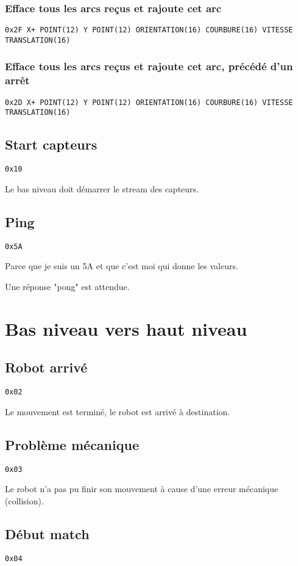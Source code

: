 \documentclass[a4paper, 12pt]{article}
\begin{document}
\subsubsection{Efface tous les arcs reçus et rajoute cet arc}

    \texttt{0x2F X+ POINT(12) Y POINT(12) ORIENTATION(16) COURBURE(16) VITESSE TRANSLATION(16)}
    
\subsubsection{Efface tous les arcs reçus et rajoute cet arc, précédé d'un arrêt} 

\texttt{0x2D X+ POINT(12) Y POINT(12) ORIENTATION(16) COURBURE(16) VITESSE TRANSLATION(16)}
    
\subsection{Start capteurs}
\texttt{0x10}
    
Le bas niveau doit démarrer le stream des capteurs.
    
\subsection{Ping}
    \texttt{0x5A}
    
    Parce que je suis un 5A et que c'est moi qui donne les valeurs.
    
    Une réponse "pong" est attendue.

\section{Bas niveau vers haut niveau}

\subsection{Robot arrivé}
    \texttt{0x02}
    
Le mouvement est terminé, le robot est arrivé à destination.
    
\subsection{Problème mécanique}
    \texttt{0x03}
    
Le robot n'a pas pu finir son mouvement à cause d'une erreur mécanique (collision).
    
\subsection{Début match}
    \texttt{0x04}
\end{document}
